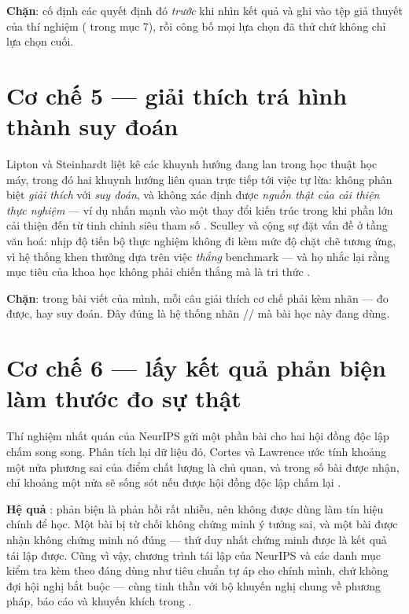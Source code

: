 \documentclass[../hieu-suat.tex]{subfiles}
\begin{document}
\textbf{Chặn}: cố định các quyết định đó \emph{trước} khi nhìn kết quả và ghi vào tệp giả thuyết của thí nghiệm ( trong  mục 7), rồi công bố mọi lựa chọn đã thử chứ không chỉ lựa chọn cuối.

\section{Cơ chế 5 --- giải thích trá hình thành suy đoán}

Lipton và Steinhardt \cite{lipton2019} liệt kê các khuynh hướng đang lan trong học thuật học máy, trong đó hai khuynh hướng liên quan trực tiếp tới việc tự lừa: không phân biệt \emph{giải thích} với \emph{suy đoán}, và không xác định được \emph{nguồn thật của cải thiện thực nghiệm} --- ví dụ nhấn mạnh vào một thay đổi kiến trúc trong khi phần lớn cải thiện đến từ tinh chỉnh siêu tham số \nT{}. Sculley và cộng sự \cite{sculley2018} đặt vấn đề ở tầng văn hoá: nhịp độ tiến bộ thực nghiệm không đi kèm mức độ chặt chẽ tương ứng, vì hệ thống khen thưởng dựa trên việc \emph{thắng} benchmark --- và họ nhắc lại rằng mục tiêu của khoa học không phải chiến thắng mà là tri thức \nT{}.

\textbf{Chặn}: trong bài viết của mình, mỗi câu giải thích cơ chế phải kèm nhãn --- đo được, hay suy đoán. Đây đúng là hệ thống nhãn \nD{}/\nT{}/\nM{} mà bài học này đang dùng.

\section{Cơ chế 6 --- lấy kết quả phản biện làm thước đo sự thật}

Thí nghiệm nhất quán của NeurIPS gửi một phần bài cho hai hội đồng độc lập chấm song song. Phân tích lại dữ liệu đó, Cortes và Lawrence \cite{cortes2021} ước tính khoảng một nửa phương sai của điểm chất lượng là chủ quan, và trong số bài được nhận, chỉ khoảng một nửa sẽ sống sót nếu được hội đồng độc lập chấm lại \nD{}.

\textbf{Hệ quả} \nM{}: phản biện là phản hồi rất nhiễu, nên không được dùng làm tín hiệu chính để học. Một bài bị từ chối không chứng minh ý tưởng sai, và một bài được nhận không chứng minh nó đúng --- thứ duy nhất chứng minh được là kết quả tái lập được. Cũng vì vậy, chương trình tái lập của NeurIPS \cite{pineau2021} và các danh mục kiểm tra kèm theo đáng dùng như tiêu chuẩn tự áp cho chính mình, chứ không đợi hội nghị bắt buộc --- cùng tinh thần với bộ khuyến nghị chung về phương pháp, báo cáo và khuyến khích trong \cite{munafo2017} \nT{}.
\end{document}
